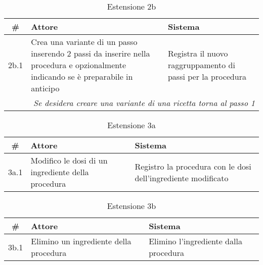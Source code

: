 \begin{table}[H]\centering\caption*{Estensione 2b}
      \small
      \begin{tabular}{|c|p{7cm}|p{6.24cm}|}
            \hline\bfseries \# & \bfseries Attore                                                                                                                                 & \bfseries Sistema                                          \\\hline
            2b.1               & Crea una variante di un passo inserendo 2 passi da inserire nella procedura e opzionalmente indicando se è preparabile in anticipo & Registra il nuovo raggruppamento di passi per la procedura \\\hline
            \multicolumn{3}{|r|}{\textit{Se desidera creare una variante di una ricetta torna al passo 1}}                                                                                                                                     \\\hline
      \end{tabular}
\end{table}

\begin{table}[H]\centering\caption*{Estensione 3a}
      \small
      \begin{tabular}{|c|p{7cm}|p{6.24cm}|}
            \hline\bfseries \# & \bfseries Attore                                   & \bfseries Sistema                                             \\\hline
            3a.1               & Modifico le dosi di un ingrediente della procedura & Registro la procedura con le dosi dell’ingrediente modificato \\\hline
      \end{tabular}
\end{table}

\begin{table}[H]\centering\caption*{Estensione 3b}
      \small
      \begin{tabular}{|c|p{7cm}|p{6.24cm}|}
            \hline\bfseries \# & \bfseries Attore                       & \bfseries Sistema                     \\\hline
            3b.1               & Elimino un ingrediente della procedura & Elimino l’ingrediente dalla procedura \\\hline
      \end{tabular}
\end{table}

